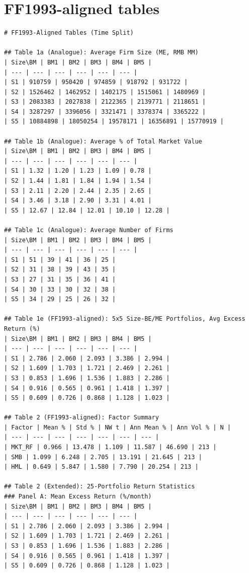 \section*{FF1993-aligned tables}
\begin{verbatim}
# FF1993-Aligned Tables (Time Split)

## Table 1a (Analogue): Average Firm Size (ME, RMB MM)
| Size\BM | BM1 | BM2 | BM3 | BM4 | BM5 |
| --- | --- | --- | --- | --- | --- |
| S1 | 910759 | 950420 | 974859 | 918792 | 931722 |
| S2 | 1526462 | 1462952 | 1402175 | 1515061 | 1480969 |
| S3 | 2083383 | 2027838 | 2122365 | 2139771 | 2118651 |
| S4 | 3287297 | 3396056 | 3321471 | 3378374 | 3365222 |
| S5 | 10884898 | 18050254 | 19578171 | 16356891 | 15770919 |

## Table 1b (Analogue): Average % of Total Market Value
| Size\BM | BM1 | BM2 | BM3 | BM4 | BM5 |
| --- | --- | --- | --- | --- | --- |
| S1 | 1.32 | 1.20 | 1.23 | 1.09 | 0.78 |
| S2 | 1.44 | 1.81 | 1.84 | 1.94 | 1.54 |
| S3 | 2.11 | 2.20 | 2.44 | 2.35 | 2.65 |
| S4 | 3.46 | 3.18 | 2.90 | 3.31 | 4.01 |
| S5 | 12.67 | 12.84 | 12.01 | 10.10 | 12.28 |

## Table 1c (Analogue): Average Number of Firms
| Size\BM | BM1 | BM2 | BM3 | BM4 | BM5 |
| --- | --- | --- | --- | --- | --- |
| S1 | 51 | 39 | 41 | 36 | 25 |
| S2 | 31 | 38 | 39 | 43 | 35 |
| S3 | 27 | 31 | 35 | 36 | 41 |
| S4 | 30 | 33 | 30 | 32 | 38 |
| S5 | 34 | 29 | 25 | 26 | 32 |

## Table 1e (FF1993-aligned): 5x5 Size-BE/ME Portfolios, Avg Excess Return (%)
| Size\BM | BM1 | BM2 | BM3 | BM4 | BM5 |
| --- | --- | --- | --- | --- | --- |
| S1 | 2.786 | 2.060 | 2.093 | 3.386 | 2.994 |
| S2 | 1.609 | 1.703 | 1.721 | 2.469 | 2.261 |
| S3 | 0.853 | 1.696 | 1.536 | 1.883 | 2.286 |
| S4 | 0.916 | 0.565 | 0.961 | 1.418 | 1.397 |
| S5 | 0.609 | 0.726 | 0.868 | 1.128 | 1.023 |

## Table 2 (FF1993-aligned): Factor Summary
| Factor | Mean % | Std % | NW t | Ann Mean % | Ann Vol % | N |
| --- | --- | --- | --- | --- | --- | --- |
| MKT_RF | 0.966 | 13.478 | 1.109 | 11.587 | 46.690 | 213 |
| SMB | 1.099 | 6.248 | 2.705 | 13.191 | 21.645 | 213 |
| HML | 0.649 | 5.847 | 1.580 | 7.790 | 20.254 | 213 |

## Table 2 (Extended): 25-Portfolio Return Statistics
### Panel A: Mean Excess Return (%/month)
| Size\BM | BM1 | BM2 | BM3 | BM4 | BM5 |
| --- | --- | --- | --- | --- | --- |
| S1 | 2.786 | 2.060 | 2.093 | 3.386 | 2.994 |
| S2 | 1.609 | 1.703 | 1.721 | 2.469 | 2.261 |
| S3 | 0.853 | 1.696 | 1.536 | 1.883 | 2.286 |
| S4 | 0.916 | 0.565 | 0.961 | 1.418 | 1.397 |
| S5 | 0.609 | 0.726 | 0.868 | 1.128 | 1.023 |


\end{verbatim}

